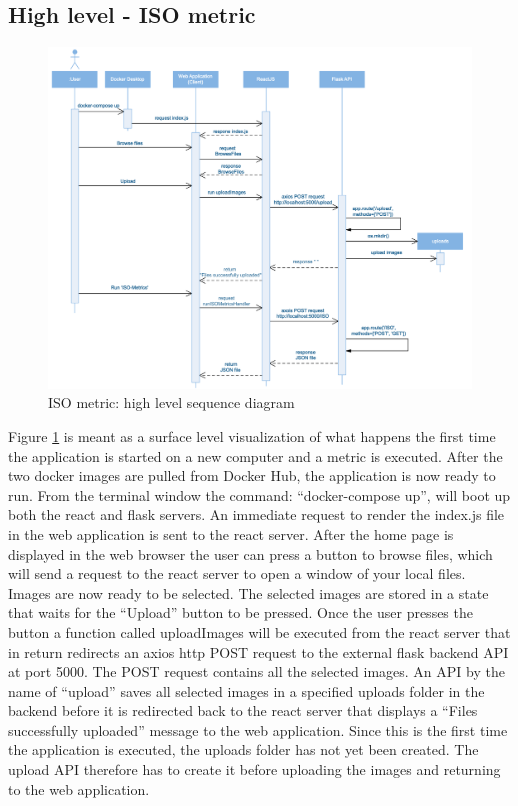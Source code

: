 \subsection{High level - ISO metric}

\begin{figure}[h]
    \centering
    \includegraphics[scale = 0.52]{figures/HighLevel.png}
    \caption{ISO metric: high level sequence diagram}
    \label{fig:highlevel}
\end{figure}
\newpage
Figure \ref{fig:highlevel} is meant as a surface level visualization of what happens the first time the application is started on a new computer and a metric is executed. After the two docker images are pulled from Docker Hub, the application is now ready to run. From the terminal window the command: ``docker-compose up'', will boot up both the react and flask servers. An immediate request to render the index.js file in the web application is sent to the react server. After the home page is displayed in the web browser the user can press a button to browse files, which will send a request to the react server to open a window of your local files. Images are now ready to be selected. The selected images are stored in a state that waits for the ``Upload'' button to be pressed. Once the user presses the button a function called uploadImages will be executed from the react server that in return redirects an axios http POST request to the external flask backend API at port 5000. The POST request contains all the selected images. An API by the name of ``upload'' saves all selected images in a specified uploads folder in the backend before it is redirected back to the react server that displays a ``Files successfully uploaded'' message to the web application. Since this is the first time the application is executed, the uploads folder has not yet been created. The upload API therefore has to create it before uploading the images and returning to the web application. 

